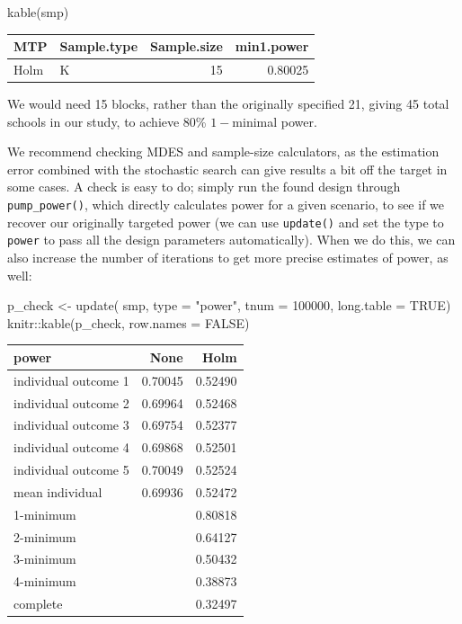 \documentclass[
]{article}
\newenvironment{Shaded}{\begin{snugshade}}{\end{snugshade}}
\newcommand{\AttributeTok}[1]{\textcolor[rgb]{0.77,0.63,0.00}{#1}}
\newcommand{\ConstantTok}[1]{\textcolor[rgb]{0.00,0.00,0.00}{#1}}
\newcommand{\DecValTok}[1]{\textcolor[rgb]{0.00,0.00,0.81}{#1}}
\newcommand{\FunctionTok}[1]{\textcolor[rgb]{0.00,0.00,0.00}{#1}}
\newcommand{\NormalTok}[1]{#1}
\newcommand{\OtherTok}[1]{\textcolor[rgb]{0.56,0.35,0.01}{#1}}
\newcommand{\SpecialCharTok}[1]{\textcolor[rgb]{0.00,0.00,0.00}{#1}}
\newcommand{\StringTok}[1]{\textcolor[rgb]{0.31,0.60,0.02}{#1}}
\begin{document}
\begin{Shaded}
\begin{Highlighting}[]
\FunctionTok{kable}\NormalTok{(smp)}
\end{Highlighting}
\end{Shaded}

\begin{tabular}{l|l|r|r}
\hline
MTP & Sample.type & Sample.size & min1.power\\
\hline
Holm & K & 15 & 0.80025\\
\hline
\end{tabular}

We would need 15 blocks, rather than the originally specified 21, giving
45 total schools in our study, to achieve 80\% \(1-\)minimal power.

We recommend checking MDES and sample-size calculators, as the
estimation error combined with the stochastic search can give results a
bit off the target in some cases. A check is easy to do; simply run the
found design through \texttt{pump\_power()}, which directly calculates
power for a given scenario, to see if we recover our originally targeted
power (we can use \texttt{update()} and set the type to \texttt{power}
to pass all the design parameters automatically). When we do this, we
can also increase the number of iterations to get more precise estimates
of power, as well:

\begin{Shaded}
\begin{Highlighting}[]
\NormalTok{p\_check }\OtherTok{\textless{}{-}} \FunctionTok{update}\NormalTok{( smp, }\AttributeTok{type =} \StringTok{"power"}\NormalTok{, }\AttributeTok{tnum =} \DecValTok{100000}\NormalTok{,}
                   \AttributeTok{long.table =} \ConstantTok{TRUE}\NormalTok{)}
\NormalTok{knitr}\SpecialCharTok{::}\FunctionTok{kable}\NormalTok{(p\_check, }\AttributeTok{row.names =} \ConstantTok{FALSE}\NormalTok{)}
\end{Highlighting}
\end{Shaded}

\begin{tabular}{l|r|r}
\hline
power & None & Holm\\
\hline
individual outcome 1 & 0.70045 & 0.52490\\
\hline
individual outcome 2 & 0.69964 & 0.52468\\
\hline
individual outcome 3 & 0.69754 & 0.52377\\
\hline
individual outcome 4 & 0.69868 & 0.52501\\
\hline
individual outcome 5 & 0.70049 & 0.52524\\
\hline
mean individual & 0.69936 & 0.52472\\
\hline
1-minimum &  & 0.80818\\
\hline
2-minimum &  & 0.64127\\
\hline
3-minimum &  & 0.50432\\
\hline
4-minimum &  & 0.38873\\
\hline
complete &  & 0.32497\\
\hline
\end{tabular}
\end{document}
